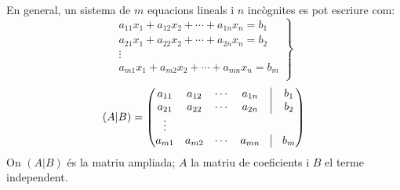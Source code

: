 \documentclass{beamer}
\begin{document}
\begin{frame}
  En general, un sistema de $m$ equacions lineals i $n$ incògnites es pot escriure com:
  \[
  \left.
  \begin{array}{c}
    a_{11}x_1+a_{12}x_2+\cdots+a_{1n}x_n=b_1\\
    a_{21}x_1+a_{22}x_2+\cdots+a_{2n}x_n=b_2\\
    \vdots\\
    a_{m1}x_1+a_{m2}x_2+\cdots+a_{mn}x_n=b_m\\
  \end{array}
  \right\}
  \]
  \[
  (A|B)= \begin{pmatrix}
  a_{11}&a_{12}&\cdots&a_{1n}&\vrule&b_1\\
  a_{21}&a_{22}&\cdots&a_{2n}&\vrule&b_2\\
  \vdots\\
  a_{m1}&a_{m2}&\cdots&a_{mn}&\vrule&b_m
  \end{pmatrix}
  \]
  On $(A|B)$ és la matriu ampliada; $A$ la matriu de coeficients i $B$ el terme independent.

\end{frame}
\end{document}
